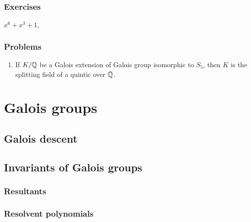 \documentclass{../note}
\begin{document}
\section*{Exercises}

$x^6+x^3+1$,



\section*{Problems}

\begin{enumerate}
\item If $K/\mathbb{Q}$ be a Galois extension of Galois group isomorphic to $S_5$, then $K$ is the splitting field of a quintic over $\mathbb{Q}$.
\end{enumerate}








\part{Galois groups}


\chapter{Galois descent}




\chapter{Invariants of Galois groups}

\section{Resultants}

\section{Resolvent polynomials}

\begin{prb}
\end{prb}
\begin{prb}
\end{prb}
\begin{prb}
\end{prb}
\begin{prb}
\end{prb}
\begin{prb}
\end{prb}
\end{document}

